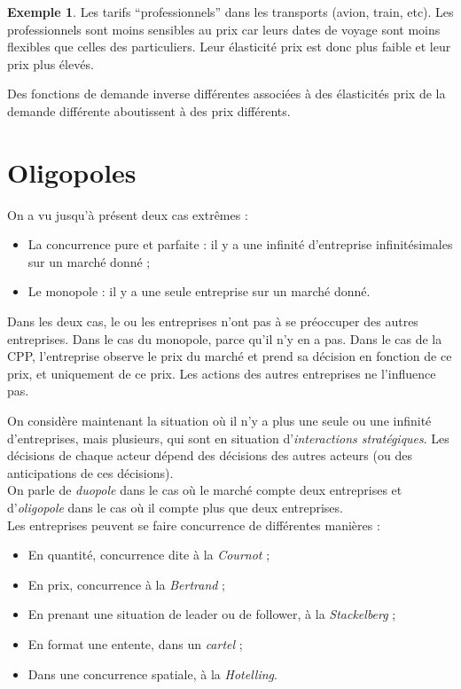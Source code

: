\documentclass[
]{book}
\providecommand{\tightlist}{%
  \setlength{\itemsep}{0pt}\setlength{\parskip}{0pt}}
\theoremstyle{definition}
\theoremstyle{definition}
\newtheorem{example}{Exemple}[chapter]
\theoremstyle{definition}
\theoremstyle{definition}
\theoremstyle{remark}
\begin{document}
\begin{example}
Les tarifs ``professionnels'' dans les transports (avion, train, etc).
Les professionnels sont moins sensibles au prix car leurs dates de voyage sont moins flexibles que celles des particuliers.
Leur élasticité prix est donc plus faible et leur prix plus élevés.
\end{example}

Des fonctions de demande inverse différentes associées à des élasticités prix de la demande différente aboutissent à des prix différents.

\hypertarget{oligopoles}{%
\chapter{Oligopoles}\label{oligopoles}}

On a vu jusqu'à présent deux cas extrêmes :

\begin{itemize}
\tightlist
\item
  La concurrence pure et parfaite :
  il y a une infinité d'entreprise infinitésimales sur un marché donné ;
\item
  Le monopole : il y a une seule entreprise sur un marché donné.
\end{itemize}

Dans les deux cas, le ou les entreprises n'ont pas à se préoccuper des autres entreprises.
Dans le cas du monopole, parce qu'il n'y en a pas.
Dans le cas de la CPP, l'entreprise observe le prix du marché et prend sa décision en fonction de ce prix, et uniquement de ce prix.
Les actions des autres entreprises ne l'influence pas.

On considère maintenant la situation où il n'y a plus une seule ou une infinité d'entreprises, mais plusieurs, qui sont en situation d'\emph{interactions stratégiques}.
Les décisions de chaque acteur dépend des décisions des autres acteurs (ou des anticipations de ces décisions).\\
On parle de \emph{duopole} dans le cas où le marché compte deux entreprises et d'\emph{oligopole} dans le cas où il compte plus que deux entreprises.\\
Les entreprises peuvent se faire concurrence de différentes manières :

\begin{itemize}
\tightlist
\item
  En quantité, concurrence dite à la \emph{Cournot} ;
\item
  En prix, concurrence à la \emph{Bertrand} ;
\item
  En prenant une situation de leader ou de follower, à la \emph{Stackelberg} ;
\item
  En format une entente, dans un \emph{cartel} ;
\item
  Dans une concurrence spatiale, à la \emph{Hotelling}.
\end{itemize}
\end{document}
